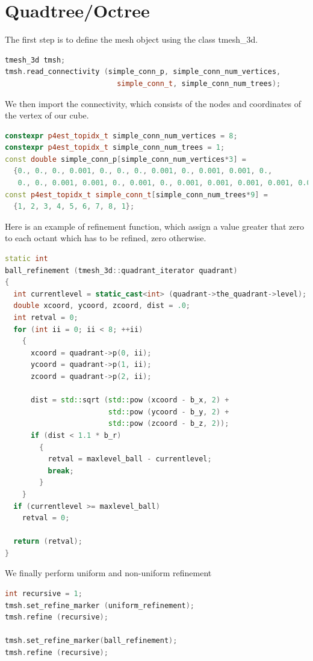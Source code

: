 \documentclass{Configuration_Files/PoliMi3i_thesis}
\begin{document}
\section{Quadtree/Octree}
\label{ch: octree}%
The first step is to define the mesh object using the class tmesh\_3d.
\begin{lstlisting}[language=C++]
tmesh_3d tmsh;
tmsh.read_connectivity (simple_conn_p, simple_conn_num_vertices,
                          simple_conn_t, simple_conn_num_trees);
\end{lstlisting}
We then import the connectivity, which consists of the nodes and coordinates of the vertex of our cube.
\begin{lstlisting}[language=C++]
constexpr p4est_topidx_t simple_conn_num_vertices = 8;
constexpr p4est_topidx_t simple_conn_num_trees = 1;
const double simple_conn_p[simple_conn_num_vertices*3] = 
  {0., 0., 0., 0.001, 0., 0., 0., 0.001, 0., 0.001, 0.001, 0.,
   0., 0., 0.001, 0.001, 0., 0.001, 0., 0.001, 0.001, 0.001, 0.001, 0.001};
const p4est_topidx_t simple_conn_t[simple_conn_num_trees*9] = 
  {1, 2, 3, 4, 5, 6, 7, 8, 1};
\end{lstlisting}
Here is an example of refinement function, which assign a value greater that zero to each octant which has to be refined, zero otherwise.
\begin{lstlisting}[language=C++]
static int
ball_refinement (tmesh_3d::quadrant_iterator quadrant)
{
  int currentlevel = static_cast<int> (quadrant->the_quadrant->level);
  double xcoord, ycoord, zcoord, dist = .0;
  int retval = 0;
  for (int ii = 0; ii < 8; ++ii)
    {
      xcoord = quadrant->p(0, ii);
      ycoord = quadrant->p(1, ii);
      zcoord = quadrant->p(2, ii);
      
      dist = std::sqrt (std::pow (xcoord - b_x, 2) +
                        std::pow (ycoord - b_y, 2) +
                        std::pow (zcoord - b_z, 2));
      if (dist < 1.1 * b_r)
        {
          retval = maxlevel_ball - currentlevel;
          break;
        }
    }
  if (currentlevel >= maxlevel_ball)
    retval = 0;
      
  return (retval);
}
\end{lstlisting}

We finally perform uniform and non-uniform refinement
\begin{lstlisting}[language=C++]
int recursive = 1;
tmsh.set_refine_marker (uniform_refinement);
tmsh.refine (recursive);

tmsh.set_refine_marker(ball_refinement);
tmsh.refine (recursive);
\end{lstlisting}
\end{document}
